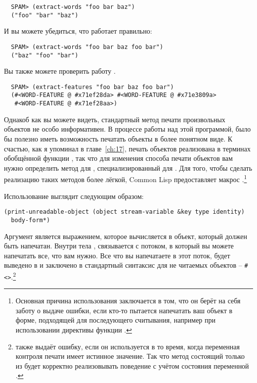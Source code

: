\begin{verbatim}
  SPAM> (extract-words "foo bar baz")
  ("foo" "bar" "baz")
\end{verbatim}

И вы можете убедиться, что  работает правильно:

\begin{verbatim}
  SPAM> (extract-words "foo bar baz foo bar")
  ("baz" "foo" "bar")
\end{verbatim}

Вы также можете проверить работу .

\begin{verbatim}
  SPAM> (extract-features "foo bar baz foo bar")
  (#<WORD-FEATURE @ #x71ef28da> #<WORD-FEATURE @ #x71e3809a>
   #<WORD-FEATURE @ #x71ef28aa>)
\end{verbatim}

Однакоб как вы можете видеть, стандартный метод печати произвольных объектов не особо
информативен.  В процессе работы над этой программой, было бы полезно иметь возможность
печатать объекты  в более понятном виде.  К счастью, как я упоминал в
главе~\ref{ch:17}, печать объектов реализована в терминах обобщённой функции
, так что для изменения способа печати объектов  вам
нужно определить метод для , специализированный для
.  Для того, чтобы сделать реализацию таких методов более лёгкой,
Common Lisp предоставляет макрос .\footnote{Основная причина
  использования  заключается в том, что он берёт на себя
  заботу о выдаче ошибки, если кто-то пытается напечатать ваш объект в форме, подходящей
  для последующего считывания, например при использовании директивы  функции
  .}

Использование  выглядит следующим образом:

\begin{lstlisting}
(print-unreadable-object (object stream-variable &key type identity)
  body-form*)
\end{lstlisting}

Аргумент  является выражением, которое вычисляется в объект, который должен
быть напечатан.  Внутри тела , 
связывается с потоком, в который вы можете напечатать все, что вам нужно. Все что вы
напечатаете в этот поток, будет выведено в  и заключено в
стандартный синтаксис для не читаемых объектов --
\lstinline!#<>!.\footnote{ также выдаёт ошибку, если он
  используется в то время, когда переменная контроля печати  имеет
  истинное значение.  Так что метод  состоящий только из
   будет корректно реализовывать поведение
   с учётом состояния переменной .}

